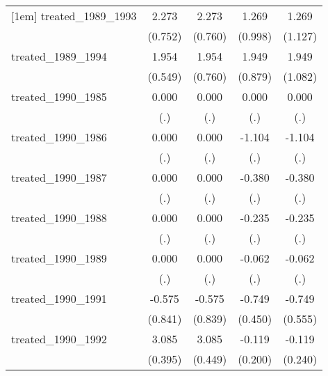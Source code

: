{\begin{tabular}{l*{4}{c}}
[1em]
treated\_1989\_1993&       2.273\sym{**} &       2.273\sym{**} &       1.269         &       1.269         \\
            &     (0.752)         &     (0.760)         &     (0.998)         &     (1.127)         \\
[1em]
treated\_1989\_1994&       1.954\sym{***}&       1.954\sym{*}  &       1.949\sym{*}  &       1.949         \\
            &     (0.549)         &     (0.760)         &     (0.879)         &     (1.082)         \\
[1em]
treated\_1990\_1985&       0.000         &       0.000         &       0.000         &       0.000         \\
            &         (.)         &         (.)         &         (.)         &         (.)         \\
[1em]
treated\_1990\_1986&       0.000         &       0.000         &      -1.104         &      -1.104         \\
            &         (.)         &         (.)         &         (.)         &         (.)         \\
[1em]
treated\_1990\_1987&       0.000         &       0.000         &      -0.380         &      -0.380         \\
            &         (.)         &         (.)         &         (.)         &         (.)         \\
[1em]
treated\_1990\_1988&       0.000         &       0.000         &      -0.235         &      -0.235         \\
            &         (.)         &         (.)         &         (.)         &         (.)         \\
[1em]
treated\_1990\_1989&       0.000         &       0.000         &      -0.062         &      -0.062         \\
            &         (.)         &         (.)         &         (.)         &         (.)         \\
[1em]
treated\_1990\_1991&      -0.575         &      -0.575         &      -0.749         &      -0.749         \\
            &     (0.841)         &     (0.839)         &     (0.450)         &     (0.555)         \\
[1em]
treated\_1990\_1992&       3.085\sym{***}&       3.085\sym{***}&      -0.119         &      -0.119         \\
            &     (0.395)         &     (0.449)         &     (0.200)         &     (0.240)         \\

\end{tabular}}
